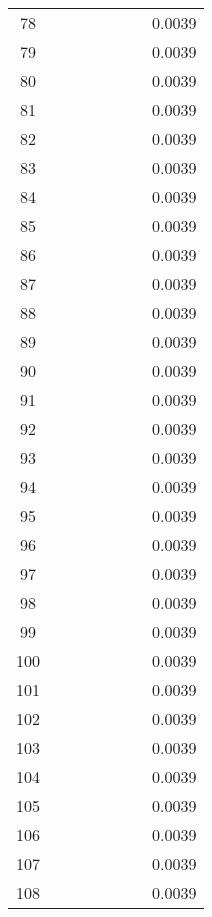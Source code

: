 \documentclass[12pt]{article}
\begin{document}
\begin{center}
\begin{longtable}{|c|c|c|c|c|c|c|c|}
            78 &  &  &  &  &  &  & 0.0039 \\
            79 &  &  &  &  &  &  & 0.0039 \\
            80 &  &  &  &  &  &  & 0.0039 \\
            81 &  &  &  &  &  &  & 0.0039 \\
            82 &  &  &  &  &  &  & 0.0039 \\
            83 &  &  &  &  &  &  & 0.0039 \\
            84 &  &  &  &  &  &  & 0.0039 \\
            85 &  &  &  &  &  &  & 0.0039 \\
            86 &  &  &  &  &  &  & 0.0039 \\
            87 &  &  &  &  &  &  & 0.0039 \\
            88 &  &  &  &  &  &  & 0.0039 \\
            89 &  &  &  &  &  &  & 0.0039 \\
            90 &  &  &  &  &  &  & 0.0039 \\
            91 &  &  &  &  &  &  & 0.0039 \\
            92 &  &  &  &  &  &  & 0.0039 \\
            93 &  &  &  &  &  &  & 0.0039 \\
            94 &  &  &  &  &  &  & 0.0039 \\
            95 &  &  &  &  &  &  & 0.0039 \\
            96 &  &  &  &  &  &  & 0.0039 \\
            97 &  &  &  &  &  &  & 0.0039 \\
            98 &  &  &  &  &  &  & 0.0039 \\
            99 &  &  &  &  &  &  & 0.0039 \\
            100 &  &  &  &  &  &  & 0.0039 \\
            101 &  &  &  &  &  &  & 0.0039 \\
            102 &  &  &  &  &  &  & 0.0039 \\
            103 &  &  &  &  &  &  & 0.0039 \\
            104 &  &  &  &  &  &  & 0.0039 \\
            105 &  &  &  &  &  &  & 0.0039 \\
            106 &  &  &  &  &  &  & 0.0039 \\
            107 &  &  &  &  &  &  & 0.0039 \\
            108 &  &  &  &  &  &  & 0.0039 \\

\end{longtable}
\end{center}
\end{document}
